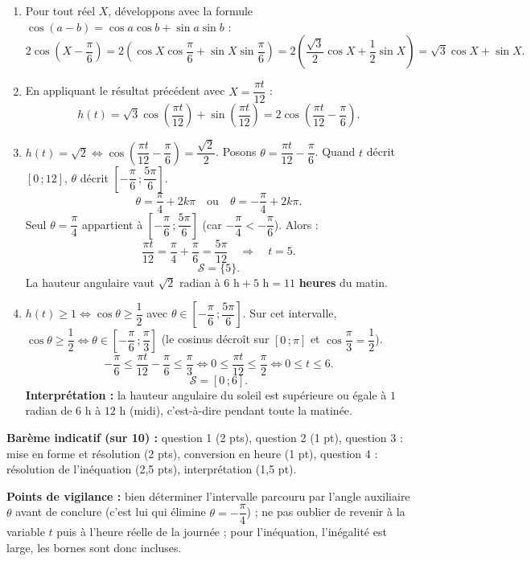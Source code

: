 \documentclass[11pt]{article}
\begin{document}
\begin{corrige}
\begin{enumerate}
\item Pour tout réel $X$, développons avec la formule $\cos(a-b)=\cos a\cos b+\sin a\sin b$ :
\[2\cos\left(X-\dfrac{\pi}{6}\right)=2\left(\cos X\cos\dfrac{\pi}{6}+\sin X\sin\dfrac{\pi}{6}\right)=2\left(\dfrac{\sqrt{3}}{2}\cos X+\dfrac{1}{2}\sin X\right)=\sqrt{3}\cos X+\sin X.\]
\item En appliquant le résultat précédent avec $X=\dfrac{\pi t}{12}$ :
\[h(t)=\sqrt{3}\cos\left(\dfrac{\pi t}{12}\right)+\sin\left(\dfrac{\pi t}{12}\right)=2\cos\left(\dfrac{\pi t}{12}-\dfrac{\pi}{6}\right).\]
\item $h(t)=\sqrt{2}\Longleftrightarrow\cos\left(\dfrac{\pi t}{12}-\dfrac{\pi}{6}\right)=\dfrac{\sqrt{2}}{2}$.
Posons $\theta=\dfrac{\pi t}{12}-\dfrac{\pi}{6}$. Quand $t$ décrit $[0\,;12]$, $\theta$ décrit $\left[-\dfrac{\pi}{6}\,;\dfrac{5\pi}{6}\right]$.
\[\theta=\dfrac{\pi}{4}+2k\pi\quad\text{ou}\quad \theta=-\dfrac{\pi}{4}+2k\pi.\]
Seul $\theta=\dfrac{\pi}{4}$ appartient à $\left[-\dfrac{\pi}{6}\,;\dfrac{5\pi}{6}\right]$ (car $-\dfrac{\pi}{4}<-\dfrac{\pi}{6}$). Alors :
\[\dfrac{\pi t}{12}=\dfrac{\pi}{4}+\dfrac{\pi}{6}=\dfrac{5\pi}{12}\quad\Longrightarrow\quad t=5.\]
\[\mathcal{S}=\{5\}.\]
La hauteur angulaire vaut $\sqrt{2}$ radian à $6\text{ h}+5\text{ h}=11$ \textbf{heures} du matin.
\item $h(t)\geq 1\Longleftrightarrow\cos\theta\geq\dfrac{1}{2}$ avec $\theta\in\left[-\dfrac{\pi}{6}\,;\dfrac{5\pi}{6}\right]$.
Sur cet intervalle, $\cos\theta\geq\dfrac{1}{2}\Longleftrightarrow\theta\in\left[-\dfrac{\pi}{6}\,;\dfrac{\pi}{3}\right]$ (le cosinus décroît sur $[0\,;\pi]$ et $\cos\dfrac{\pi}{3}=\dfrac12$).
\[-\dfrac{\pi}{6}\leq\dfrac{\pi t}{12}-\dfrac{\pi}{6}\leq\dfrac{\pi}{3}\Longleftrightarrow 0\leq\dfrac{\pi t}{12}\leq\dfrac{\pi}{2}\Longleftrightarrow 0\leq t\leq 6.\]
\[\mathcal{S}=[0\,;6].\]
\textbf{Interprétation :} la hauteur angulaire du soleil est supérieure ou égale à $1$ radian de $6$ h à $12$ h (midi), c'est-à-dire pendant toute la matinée.
\end{enumerate}
\textbf{Barème indicatif (sur 10) :} question 1 (2 pts), question 2 (1 pt), question 3 : mise en forme et résolution (2 pts), conversion en heure (1 pt), question 4 : résolution de l'inéquation (2,5 pts), interprétation (1,5 pt).

\textbf{Points de vigilance :} bien déterminer l'intervalle parcouru par l'angle auxiliaire $\theta$ avant de conclure (c'est lui qui élimine $\theta=-\dfrac{\pi}{4}$) ; ne pas oublier de revenir à la variable $t$ puis à l'heure réelle de la journée ; pour l'inéquation, l'inégalité est large, les bornes sont donc incluses.
\end{corrige}
\end{document}
